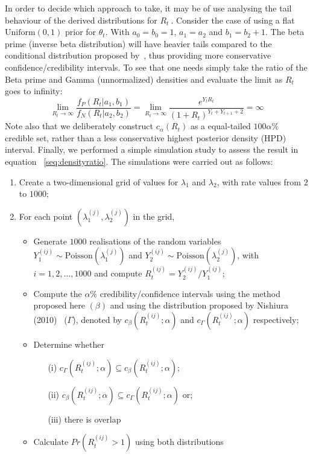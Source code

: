 \documentclass[a4paper,10pt]{article}
\def \rr {$R_{t}\:$}
\begin{document}
In order to decide which approach to take, it may be of use analysing the 
tail behaviour of the derived distributions for \rr. 
Consider the case of using a flat $\text{Uniform}(0, 1)$ prior for $\theta_t$.
With $a_0 = b_0 = 1$, $a_1 = a_2$ and $b_1 = b_2 + 1$.
The beta prime (inverse beta distribution) will have heavier tails compared to 
the conditional distribution proposed by~\citep{nishiura}, thus providing more 
conservative confidence/credibility intervals.
To see that one needs simply take the ratio of the Beta prime and Gamma 
(unnormalized) densities and evaluate the limit as $R_t$ goes to infinity:
\begin{equation}
 \label{seq:densityratio}
 \lim_{R_t\to\infty}\frac{f_P(R_t| a_1, b_1)}{f_N(R_t| a_2, b_2)} =  
\lim_{R_t\to\infty}\frac{e^{Y_{t}R_t}}{(1 +R_t)^{Y_{t} + Y_{t +1}+2}} = \infty
\end{equation}
Note also that we deliberately construct $c_{\alpha}(R_{t})$ as a 
equal-tailed $100\alpha\%$ credible set, rather than a less conservative 
highest posterior density (HPD) interval.
Finally, we performed a simple simulation study to assess the result in equation
~\ref{seq:densityratio}.
The simulations were carried out as follows:
\begin{enumerate}
 \item Create a two-dimensional grid of values for $\lambda_1$ and $\lambda_2$, 
with rate values from $2$ to $1000$;
\item For each point $(\lambda_1^{(j)}, \lambda_2^{(j)})$ in the grid,
\begin{itemize}
 \item Generate $1000$ realisations of the random variables $Y_{1}^{(ij)} \sim 
\text{Poisson}(\lambda_1^{(j)})$ and $Y_{2}^{(ij)} \sim 
\text{Poisson}(\lambda_2^{(j)})$, with $i= 1, 2, \ldots, 1000$  and compute 
$R_{t}^{(ij)} = Y_{2}^{(ij)}/
Y_{1}^{(ij)}$;
\item Compute the $\alpha\%$ credibility/confidence intervals using the method 
proposed here $(\beta)$ and using the distribution proposed by Nishiura 
(2010)~\cite{nishiura} ($\Gamma$), denoted by $c_{\beta}(R_{t}^{(ij)}; 
\alpha)$ and 
$c_{\Gamma}(R_{t}^{(ij)}; \alpha)$ respectively;
\item Determine whether
\begin{itemize}
 \item [(i)] $ c_{\Gamma}(R_{t}^{(ij)}; \alpha) \subseteq 
c_{\beta}(R_{t}^{(ij)}; \alpha)$;
\item [(ii)] $c_{\beta}(R_{t}^{(ij)}; \alpha) \subseteq 
c_{\Gamma}(R_{t}^{(ij)}; \alpha)$ or;
\item [(iii)] there is overlap
\end{itemize}
\item Calculate $Pr(R_{t}^{(ij)} > 1)$ using both distributions
\end{itemize}
\end{enumerate}
\end{document}
